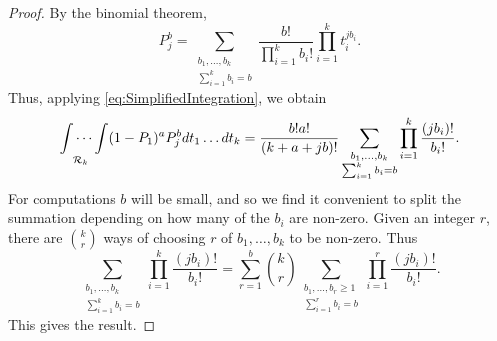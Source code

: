 \documentclass[12pt,a4paper]{amsart}
\theoremstyle{plain}
\numberwithin{sblmm}{thrm}
\numberwithin{equation}{section}
\begin{document}
\begin{proof}
By the binomial theorem,
\begin{equation}
P_j^b=\sum_{\substack{b_1,\dots,b_k\\ \sum_{i=1}^kb_i=b}}\frac{b!}{\prod_{i=1}^k b_i!}\prod_{i=1}^k t_i^{jb_i}.
\end{equation}
Thus, applying \eqref{eq:SimplifiedIntegration}, we obtain
\begin{equation}
\idotsint\limits_{\mathcal{R}_k}(1-P_1)^aP_j^bdt_1\dotsc dt_k=\frac{b!a!}{(k+a+jb)!}\sum_{\substack{b_1,\dotsc,b_k\\ \sum_{i=1}^k b_i=b}}\prod_{i=1}^k\frac{(jb_i)!}{b_i!}.
\end{equation}
For computations $b$ will be small, and so we find it convenient to split the summation depending on how many of the $b_i$ are non-zero. Given an integer $r$, there are $\binom{k}{r}$ ways of choosing $r$ of $b_1,\dotsc,b_k$ to be non-zero. Thus
\begin{equation}
\sum_{\substack{b_1,\dotsc,b_k\\ \sum_{i=1}^k b_i=b}}\prod_{i=1}^k\frac{(jb_i)!}{b_i!}=\sum_{r=1}^b\binom{k}{r}\sum_{\substack{b_1,\dots,b_r\ge 1\\ \sum_{i=1}^rb_i=b}}\prod_{i=1}^r\frac{(jb_i)!}{b_i!}.
\end{equation}
This gives the result.

\end{proof}
\end{document}
